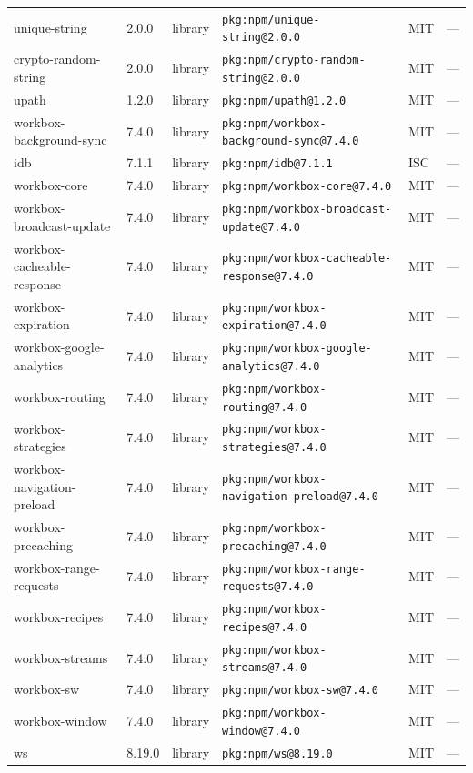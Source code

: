 \documentclass[11pt]{article}
\begin{document}
\begin{longtable}{|l|l|l|p{2.2cm}|l|p{4cm}|}
unique-string & 2.0.0 & library & \texttt{pkg:npm/unique-string@2.0.0} & MIT & — \\
crypto-random-string & 2.0.0 & library & \texttt{pkg:npm/crypto-random-string@2.0.0} & MIT & — \\
upath & 1.2.0 & library & \texttt{pkg:npm/upath@1.2.0} & MIT & — \\
workbox-background-sync & 7.4.0 & library & \texttt{pkg:npm/workbox-background-sync@7.4.0} & MIT & — \\
idb & 7.1.1 & library & \texttt{pkg:npm/idb@7.1.1} & ISC & — \\
workbox-core & 7.4.0 & library & \texttt{pkg:npm/workbox-core@7.4.0} & MIT & — \\
workbox-broadcast-update & 7.4.0 & library & \texttt{pkg:npm/workbox-broadcast-update@7.4.0} & MIT & — \\
workbox-cacheable-response & 7.4.0 & library & \texttt{pkg:npm/workbox-cacheable-response@7.4.0} & MIT & — \\
workbox-expiration & 7.4.0 & library & \texttt{pkg:npm/workbox-expiration@7.4.0} & MIT & — \\
workbox-google-analytics & 7.4.0 & library & \texttt{pkg:npm/workbox-google-analytics@7.4.0} & MIT & — \\
workbox-routing & 7.4.0 & library & \texttt{pkg:npm/workbox-routing@7.4.0} & MIT & — \\
workbox-strategies & 7.4.0 & library & \texttt{pkg:npm/workbox-strategies@7.4.0} & MIT & — \\
workbox-navigation-preload & 7.4.0 & library & \texttt{pkg:npm/workbox-navigation-preload@7.4.0} & MIT & — \\
workbox-precaching & 7.4.0 & library & \texttt{pkg:npm/workbox-precaching@7.4.0} & MIT & — \\
workbox-range-requests & 7.4.0 & library & \texttt{pkg:npm/workbox-range-requests@7.4.0} & MIT & — \\
workbox-recipes & 7.4.0 & library & \texttt{pkg:npm/workbox-recipes@7.4.0} & MIT & — \\
workbox-streams & 7.4.0 & library & \texttt{pkg:npm/workbox-streams@7.4.0} & MIT & — \\
workbox-sw & 7.4.0 & library & \texttt{pkg:npm/workbox-sw@7.4.0} & MIT & — \\
workbox-window & 7.4.0 & library & \texttt{pkg:npm/workbox-window@7.4.0} & MIT & — \\
ws & 8.19.0 & library & \texttt{pkg:npm/ws@8.19.0} & MIT & — \\

\end{longtable}
\end{document}

